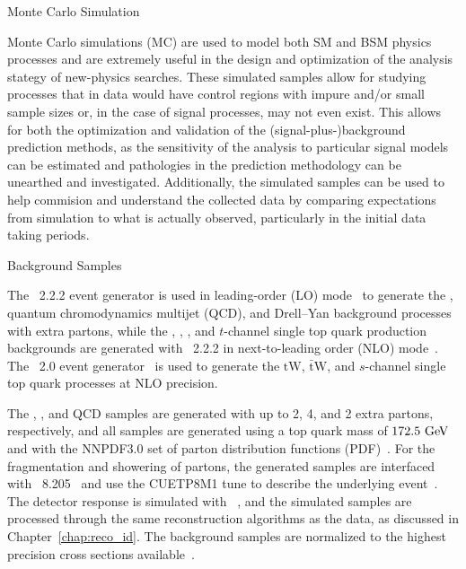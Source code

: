 \begin{section}{Monte Carlo Simulation}

Monte Carlo simulations (MC) are used to model both SM and BSM physics processes and are extremely useful in the design and optimization of the analysis stategy of new-physics searches.
These simulated samples allow for studying processes that in data would have control regions with impure and/or small sample sizes or, in the case of signal processes, may not even exist.
This allows for both the optimization and validation of the (signal-plus-)background prediction methods, as the sensitivity of the analysis to particular signal models can be estimated and pathologies in the prediction methodology can be unearthed and investigated.
Additionally, the simulated samples can be used to help commision and understand the collected data by comparing expectations from simulation to what is actually observed, particularly in the initial data taking periods.

\begin{subsection}{Background Samples}

The \MGatNLO~2.2.2 event generator is used in leading-order (LO) mode~\cite{Alwall:2014hca,Alwall:2007fs} to generate the
\ttbar, quantum chromodynamics multijet (QCD), \Wjets and Drell--Yan background processes with extra partons, while the \ttW, \ttZ, \tttt, and $t$-channel single top quark production backgrounds are generated with \MGatNLO~2.2.2 in next-to-leading order (NLO) mode~\cite{Frederix:2012ps}.
The \POWHEG~2.0 event generator~\cite{Nason:2004rx,Frixione:2007vw,Alioli:2010xd} is used to generate the $\mathrm{tW}$, $\mathrm{\bar{t}W}$, and $s$-channel single top quark processes at NLO precision.

The \ttbar, \Wjets, and QCD samples are generated with up to 2, 4, and 2 extra partons, respectively, and all samples are generated using a top quark mass of $172.5~\mathrm{Ge\kern -0.1em V}$ and with the NNPDF3.0 set of parton distribution functions (PDF)~\cite{Ball:2014uwa}.
For the fragmentation and showering of partons, the generated samples are interfaced with \PYTHIA~8.205~\cite{pythia8.2} and use the CUETP8M1 tune to describe the underlying event~\cite{Skands2014}.
The detector response is simulated with \GEANTfour~\cite{Agostinelli:2002hh}, and the simulated samples are processed through the same reconstruction algorithms as the data, as discussed in Chapter~\ref{chap:reco_id}.
The background samples are normalized to the highest precision cross sections available~\cite{PhysRevLett.110.252004,Gavin:2012sy,Alioli:2009je,Re:2010bp,Frixione:2015zaa,Bevilacqua:2012em,Nagy:2001fj}.


\end{subsection}
\end{section}
